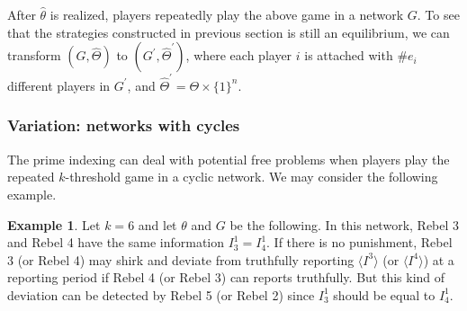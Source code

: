 \documentclass[12pt,letter]{article}
\theoremstyle{definition}
\newtheorem{example}{Example}[section]
\theoremstyle{remark}
\theoremstyle{claim}
\begin{document}
After $\hat{\theta}$ is realized, players repeatedly play the above game in a network $G$. To see that the strategies constructed in previous section is still an equilibrium, we can transform $(G,\hat{\Theta})$ to $(G^{'},\hat{\Theta}^{'})$, where each player $i$ is attached with $\#e_i$ different players in $G^{'}$, and $\hat{\Theta}^{'}=\Theta\times \{1\}^{n}$. 


\subsubsection{Variation: networks with cycles}

The prime indexing can deal with potential free problems when players play the repeated $k$-threshold game in a cyclic network. We may consider the following example.

\begin{example}
\label{ex_no_free_rider_cycle}
Let $k=6$ and let $\theta$ and $G$ be the following. In this network, Rebel 3 and Rebel 4 have the same information $I^1_3=I^1_4$. If there is no punishment, Rebel 3 (or Rebel 4) may shirk and deviate from truthfully reporting $\langle I^3 \rangle$ (or $\langle I^4 \rangle$) at a reporting period if Rebel 4 (or Rebel 3) can reports truthfully. But this kind of deviation can be detected by Rebel 5 (or Rebel 2) since $I^1_3$ should be equal to $I^1_4$. 

\begin{center}
\end{center}

\end{example}
\end{document}
